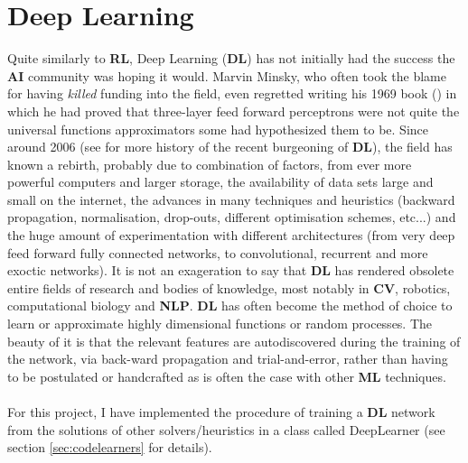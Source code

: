 


\section{Deep Learning}

Quite similarly to \textbf{RL}, Deep Learning (\textbf{DL}) has not initially had the success the \textbf{AI} community was hoping it would. Marvin Minsky, who often took the blame for having \textit{killed} funding into the field, even regretted writing his 1969 book (\cite{minskypapert69}) in which he had proved that three-layer feed forward perceptrons were not quite the universal functions approximators some had hypothesized them to be. Since around 2006 (see \cite{GoodBengCour16} for more history of the recent burgeoning of \textbf{DL}), the field has known a rebirth, probably due to combination of factors, from ever more powerful computers and larger storage, the availability of data sets large and small on the internet, the advances in many techniques and heuristics (backward propagation, normalisation, drop-outs, different optimisation schemes, etc...) and the huge amount of experimentation with different architectures (from very deep feed forward fully connected networks, to convolutional, recurrent and more exoctic networks). It is not an exageration to say that \textbf{DL} has rendered obsolete entire fields of research and bodies of knowledge, most notably in \textbf{CV}, robotics, computational biology and \textbf{NLP}. \textbf{DL} has often become the method of choice to learn or approximate highly dimensional functions or random processes. The beauty of it is that the relevant features are autodiscovered during the training of the network, via back-ward propagation and trial-and-error, rather than having to be postulated or handcrafted as is often the case with other \textbf{ML} techniques.
\\
\\
For this project, I have implemented the procedure of training a \textbf{DL} network from the solutions of other solvers/heuristics in a class called DeepLearner (see section \ref{sec:codelearners} for details).


